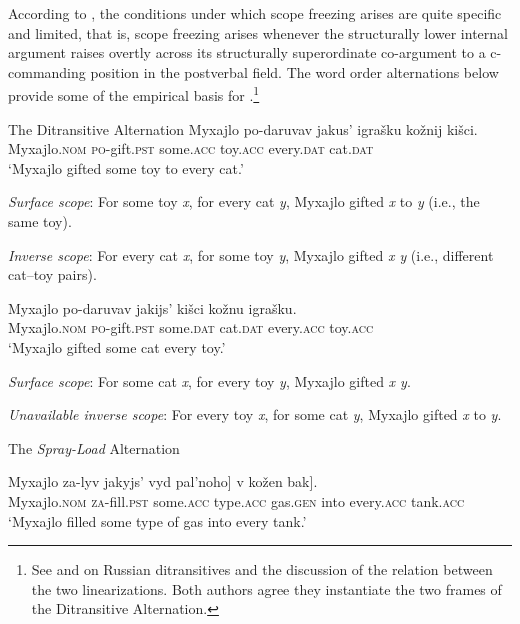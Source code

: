 \documentclass[output=paper,colorlinks,citecolor=brown]{langscibook}
\begin{document}
\noindent According to , the conditions under which scope freezing arises are quite specific and limited, that is, scope freezing arises whenever the structurally lower internal argument raises overtly across its structurally superordinate co-argument to a c-commanding position in the postverbal field. The word order alternations below provide some of the empirical basis for .\footnote{See \citet{Dyakonova2009} and \citet{Bailyn2010, Bailyn2012} on Russian ditransitives and the discussion of the relation between the two linearizations. Both authors agree they instantiate the two frames of the Ditransitive Alternation.}

\ea%
The Ditransitive Alternation
    \label{ex:antonyuk:7}
\ea
\gll   Myxajlo   po-daruvav   jakus’ igrašku     kožnij kišci.    \\
Myxajlo.\textsc{nom}     \textsc{po}-gift.\textsc{pst} some.\textsc{acc} toy.\textsc{acc}    every.\textsc{dat} cat.\textsc{dat}\\
\glt ‘Myxajlo gifted some toy to every cat.’

\textit{Surface scope}: For some toy \textit{x}, for every cat \textit{y}, Myxajlo gifted \textit{x} to \textit{y} (i.e., the same toy).

\textit{Inverse scope}: For every cat \textit{x}, for some toy \textit{y}, Myxajlo gifted \textit{x y} (i.e., different cat--toy pairs).

\ex
\gll Myxajlo   po-daruvav     jakijs’ kišci   kožnu igrašku.    \\
  Myxajlo.\textsc{nom}     \textsc{po}-gift.\textsc{pst} some.\textsc{dat} cat.\textsc{dat}   every.\textsc{acc} toy.\textsc{acc}\\
\glt `Myxajlo gifted some cat every toy.’

\textit{Surface scope}: For some cat \textit{x}, for every toy \textit{y}, Myxajlo gifted \textit{x y}.

\textit{Unavailable inverse scope}: For every toy \textit{x}, for some cat \textit{y}, Myxajlo gifted \textit{x} to \textit{y}.
    \z
\z


\ea%
    \label{ex:antonyuk:8}
The \textit{Spray-Load} Alternation

 \ea \label{ex:antonyuk:8a}
\gll    Myxajlo   za-lyv     \minsp{[} jakyjs’ vyd pal’noho]   \minsp{[} v kožen bak].\\
  Myxajlo.\textsc{nom}   \textsc{za}-fill.\textsc{pst} {} some.\textsc{acc} type.\textsc{acc} gas.\textsc{gen}  {} into every.\textsc{acc} tank.\textsc{acc}\\
\glt `Myxajlo filled some type of gas into every tank.’
\end{document}
